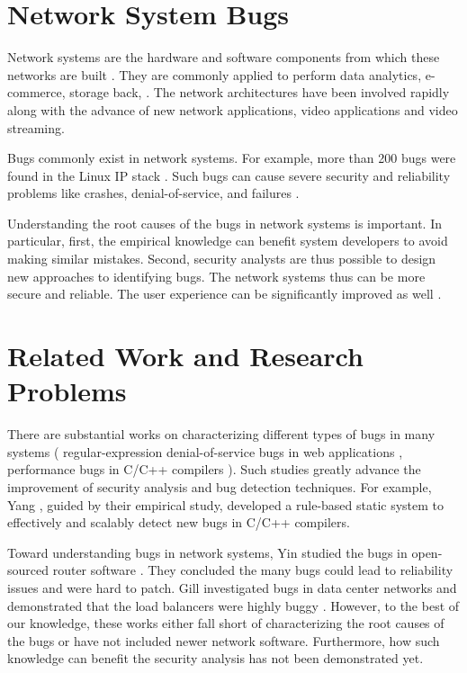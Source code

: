 \section{Network System Bugs}

Network systems are the hardware and software components from which these networks are built \cite{serpanos2011architecture}.
They are commonly applied to perform data analytics, e-commerce, storage back, \etc{} \cite{gill2011understanding}.
The network architectures have been involved rapidly along with the advance of new network applications, \eg{} video applications and video streaming.

Bugs commonly exist in network systems.
For example, more than 200 bugs were found in the Linux IP stack \cite{bugzilla}.
Such bugs can cause severe security and reliability problems like crashes, denial-of-service, and failures \cite{gill2011understanding}.

Understanding the root causes of the bugs in network systems is important.
In particular,
first, the empirical knowledge can benefit system developers to avoid making similar mistakes.
Second, security analysts are thus possible to design new approaches to identifying bugs.
The network systems thus can be more secure and reliable.
The user experience can be significantly improved as well \cite{user-exp}.

\section{Related Work and Research Problems}
There are substantial works on characterizing different types of bugs in many systems  (\eg{} regular-expression denial-of-service bugs in web applications \cite{perfbugstudy, nistor2013toddler,nistor2015caramel}, performance bugs in C/C++ compilers \cite{sun2016toward, yang2011finding}).
Such studies greatly advance the improvement of security analysis and bug detection techniques.
For example, Yang \etal{}, guided by their empirical study, developed a rule-based static system to effectively and scalably detect new bugs in C/C++ compilers.

Toward understanding bugs in network systems, Yin \etal{} studied the bugs in open-sourced router software \cite{yin2010towards}.
They concluded the many bugs could lead to reliability issues and were hard to patch.
Gill \etc{} investigated bugs in data center networks and demonstrated that the load balancers were highly buggy \cite{gill2011understanding}.
However, to the best of our knowledge, these works either fall short of characterizing the root causes of the bugs or have not included newer network software.
Furthermore, how such knowledge can benefit the security analysis has not been demonstrated yet.


